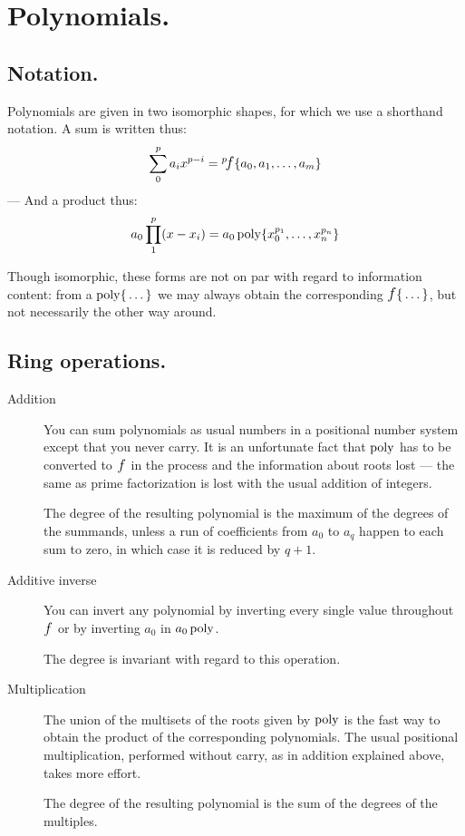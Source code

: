 \section{ Polynomials. }

\subsection{ Notation. }

Polynomials are given in two isomorphic shapes, for which we use a shorthand notation.  A sum is
written thus:
$$ \sum_{0}^{p} a_i x^{p - i} = \f{p}{a_0, a_1, \dots, a_m} $$
--- And a product thus:
$$ a_0\prod_{1}^{p} (x - x_i) = \poly {a_0} { x_0^{p_1}, \dots, x_n^{p_n} } $$

Though isomorphic, these forms are not on par with regard to information content: from a
$\poly{}{\dots}$ we may always obtain the corresponding $\f{}{\dots}$, but not necessarily the
other way around.

\subsection{ Ring operations. }

\begin{description}

    \item [Addition] You can sum polynomials as usual numbers in a positional number system
         except that you never carry. It
        is an unfortunate fact that $\poly{}{}$ has to be converted to $\f{}{}$ in the process and
        the information about roots lost --- the same as prime factorization is lost with the
        usual addition of integers.

        The degree of the resulting polynomial is the maximum of the degrees of the summands,
        unless a run of coefficients from $a_0$ to $a_q$ happen to each sum to zero, in which case
        it is reduced by $q + 1$.

    \item [Additive inverse] You can invert any polynomial by inverting every single value
        throughout $\f{}{}$ or by inverting $a_0$ in $\poly{a_0}{}$.
        
        The degree is invariant with regard to this operation.

    \item [Multiplication] The union of the multisets of the roots given by $\poly{}{}$ is the
        fast way to obtain the product of the corresponding polynomials. The usual positional
        multiplication, performed without carry, as in addition explained above, takes more
        effort.

        The degree of the resulting polynomial is the sum of the degrees of the multiples.

\end{description}
